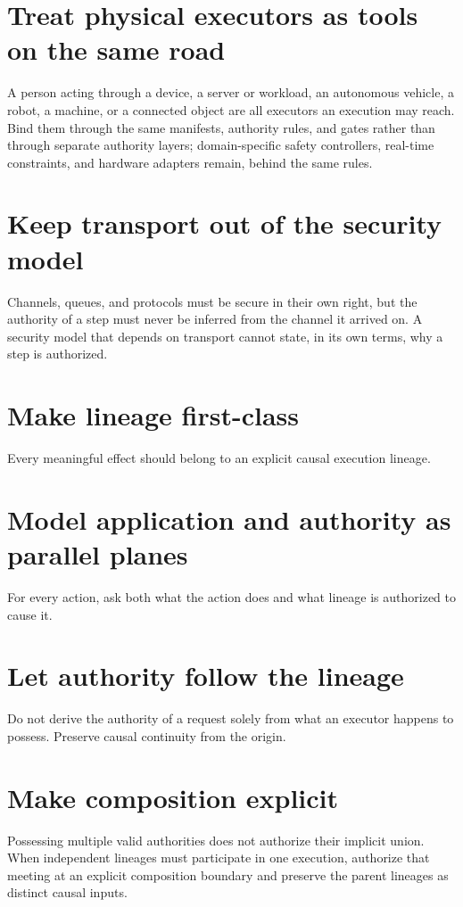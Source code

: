 \documentclass[10pt,oneside,openany]{book}
\begin{document}
\section{Treat physical executors as tools on the same road}
A person acting through a device, a server or workload, an autonomous vehicle, a robot, a machine, or a connected object are all executors an execution may reach. Bind them through the same manifests, authority rules, and gates rather than through separate authority layers; domain-specific safety controllers, real-time constraints, and hardware adapters remain, behind the same rules.

\section{Keep transport out of the security model}
Channels, queues, and protocols must be secure in their own right, but the authority of a step must never be inferred from the channel it arrived on. A security model that depends on transport cannot state, in its own terms, why a step is authorized.

\section{Make lineage first-class}
Every meaningful effect should belong to an explicit causal execution lineage.

\section{Model application and authority as parallel planes}
For every action, ask both what the action does and what lineage is authorized to cause it.

\section{Let authority follow the lineage}
Do not derive the authority of a request solely from what an executor happens to possess. Preserve causal continuity from the origin.

\section{Make composition explicit}
Possessing multiple valid authorities does not authorize their implicit union. When independent lineages must participate in one execution, authorize that meeting at an explicit composition boundary and preserve the parent lineages as distinct causal inputs.
\end{document}
